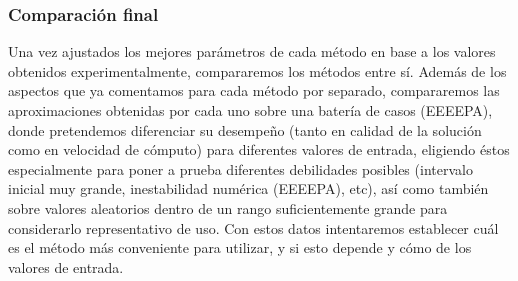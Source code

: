 	\subsubsection{Comparación final}
Una vez ajustados los mejores parámetros de cada método en base a los valores obtenidos experimentalmente, compararemos los métodos entre sí. Además de los aspectos que ya comentamos para cada método por separado, compararemos las aproximaciones obtenidas por cada uno sobre una batería de casos (EEEEPA), donde pretendemos diferenciar su desempeño (tanto en calidad de la solución como en velocidad de cómputo) para diferentes valores de entrada, eligiendo éstos especialmente para poner a prueba diferentes debilidades posibles (intervalo inicial muy grande, inestabilidad numérica (EEEEPA), etc), así como también sobre valores aleatorios dentro de un rango suficientemente grande para considerarlo representativo de uso. Con estos datos intentaremos establecer cuál es el método más conveniente para utilizar, y si esto depende y cómo de los valores de entrada.


